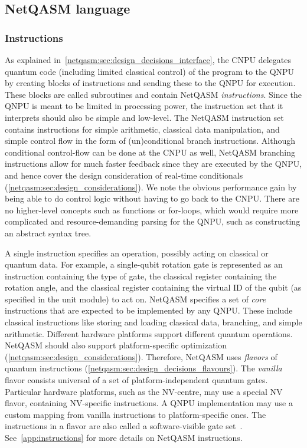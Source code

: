\subsection{NetQASM language}

\subsubsection{Instructions}
\label{netqasm:sec:design_decisions_language}
As explained in~\cref{netqasm:sec:design_decisions_interface}, the \ac{CNPU} delegates quantum code (including limited classical control) of the program to the \ac{QNPU} by creating blocks of instructions and sending these to the \ac{QNPU} for execution.
These blocks are called subroutines and contain \ac{NetQASM} \textit{instructions}.
Since the \ac{QNPU} is meant to be limited in processing power, the instruction set that it interprets should also be simple and low-level.
The \ac{NetQASM} instruction set contains instructions for simple arithmetic, classical data manipulation, and simple control flow in the form of (un)conditional branch instructions.
Although conditional control-flow can be done at the \ac{CNPU} as well, \ac{NetQASM} branching instructions allow for much faster feedback since they are executed by the \ac{QNPU}, and hence cover the design consideration of real-time conditionals (\cref{netqasm:sec:design_considerations}).
We note the obvious performance gain by being able to do control logic without having to go back to the \ac{CNPU}.
There are no higher-level concepts such as functions or for-loops, which would require more complicated and resource-demanding parsing for the \ac{QNPU}, such as constructing an abstract syntax tree.

A single instruction specifies an operation, possibly acting on classical or quantum data.
For example, a single-qubit rotation gate is represented as an instruction containing the type of gate, the classical register containing the rotation angle, and the classical register containing the virtual ID of the qubit (as specified in the unit module) to act on.
\ac{NetQASM} specifies a set of \textit{core} instructions that are expected to be implemented by any \ac{QNPU}.
These include classical instructions like storing and loading classical data, branching, and simple arithmetic.
Different hardware platforms support different quantum operations.
\ac{NetQASM} should also support platform-specific optimization (\cref{netqasm:sec:design_considerations}).
Therefore, \ac{NetQASM} uses \textit{flavors} of quantum instructions (\cref{netqasm:sec:design_decisions_flavours}).
The \textit{vanilla} flavor consists universal of a set of platform-independent quantum gates.
Particular hardware platforms, such as the NV-centre, may use a special NV flavor, containing NV-specific instructions.
A \ac{QNPU} implementation may use a custom mapping from vanilla instructions to platform-specific ones.
The instructions in a flavor are also called a software-visible gate set~\cite{murali2019fullstack}.
See~\cref{app:instructions} for more details on \ac{NetQASM} instructions.

